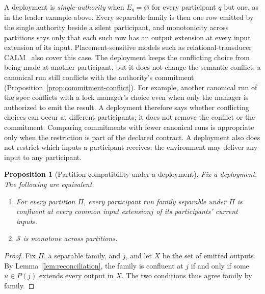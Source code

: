 \documentclass[sigconf]{cidr-2027}
\newtheorem{proposition}{Proposition}
\theoremstyle{remark}
\newcommand{\commitment}{commitment\xspace}
\newcommand{\commitments}{commitments\xspace}
\newcommand{\indesc}{input extension\xspace} %
\newcommand{\outrel}{extends\xspace}          %
\newcommand{\outnoun}{output extension\xspace}%
\newcommand{\Spec}{\mathcal{S}}
\newcommand{\fiber}[1]{P(#1)}
\begin{document}
\color{blue!70!black}A deployment is \emph{single-authority} when $E_q=\varnothing$ for every
participant $q$ but one, as in the leader example above.  Every separable family
is then one row emitted by the single authority beside a silent participant, and
monotonicity across partitions says only that each such row has an \outnoun at
every \indesc of its input.  Placement-sensitive models such as
relational-transducer CALM~\cite{ameloot2013relational,ameloot2015weaker} also
cover this case.  The deployment keeps the conflicting choice from being made
at another participant, but it does not change the semantic conflict: a
canonical run still conflicts with the authority's \commitment
(Proposition~\ref{prop:commitment-conflict}).  For example, another canonical
run of the spec conflicts with a lock manager's choice even when only the
manager is authorized to emit the result.  A deployment therefore says whether
conflicting choices can occur at different participants; it does not remove
the conflict or the \commitment.  Comparing \commitments with fewer canonical
runs is appropriate only when the restriction is part of the declared
contract.  A deployment also does not restrict which inputs a participant
receives: the environment may deliver any input to any participant.\color{black}

\begin{proposition}[Partition compatibility under a deployment]
\label{thm:complete-cap-deployment}
Fix a deployment.  The following are equivalent.
\begin{enumerate}
  \item For every partition $\Pi$, every participant run family separable
        under $\Pi$ is confluent at every common \indesc $j$ of its
        participants' current inputs.
  \item $\Spec$ is monotone across partitions.
\end{enumerate}
\end{proposition}

\begin{proof}
Fix $\Pi$, a separable family, and $j$, and let $X$ be the set of emitted
outputs.  By Lemma~\ref{lem:reconciliation}, the family is confluent at $j$ if
and only if some $u\in\fiber{j}$ \outrel every output in $X$.  The two
conditions thus agree family by family.
\end{proof}
\end{document}
